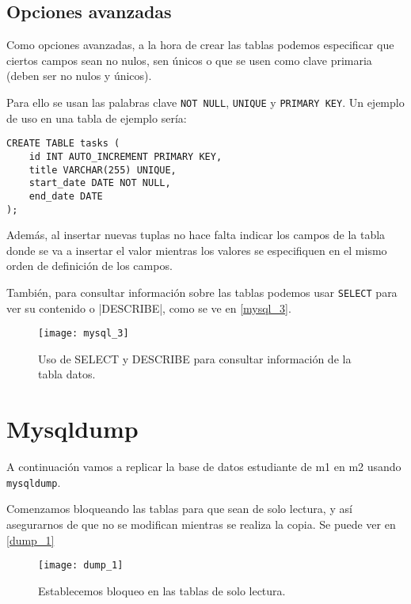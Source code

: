 \section{Opciones avanzadas}

Como opciones avanzadas, a la hora de crear las tablas podemos especificar que ciertos campos sean no nulos, sen únicos o que se usen como clave primaria (deben ser no nulos y únicos).

Para ello se usan las palabras clave \verb|NOT NULL|, \verb|UNIQUE| y \verb|PRIMARY KEY|. Un ejemplo de uso en una tabla de ejemplo sería:

\begin{verbatim}
CREATE TABLE tasks (
    id INT AUTO_INCREMENT PRIMARY KEY,
    title VARCHAR(255) UNIQUE,
    start_date DATE NOT NULL,
    end_date DATE
);
\end{verbatim}

Además, al insertar nuevas tuplas no hace falta indicar los campos de la tabla donde se va a insertar el valor mientras los valores se especifiquen en el mismo orden de definición de los campos.

También, para consultar información sobre las tablas podemos usar \verb|SELECT| para ver su contenido o |DESCRIBE|, como se ve en \eqref{mysql_3}.

\begin{figure}[h!]
\begin{center}
\caption{Uso de SELECT y DESCRIBE para consultar información de la tabla datos.}
\label{mysql_3}
\texttt{[image: mysql\_3]}
\end{center}
\end{figure}

\chapter{Mysqldump}

A continuación vamos a replicar la base de datos estudiante de m1 en m2 usando \verb|mysqldump|.

Comenzamos bloqueando las tablas para que sean de solo lectura, y así asegurarnos de que no se modifican mientras se realiza la copia. Se puede ver en \eqref{dump_1}

\begin{figure}[h!]
\begin{center}
\caption{Establecemos bloqueo en las tablas de solo lectura.}
\label{dump_1}
\texttt{[image: dump\_1]}
\end{center}
\end{figure}

